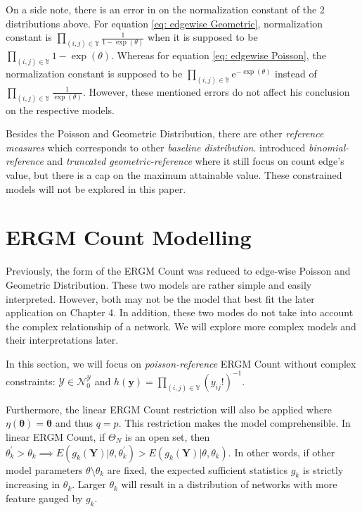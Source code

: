 \documentclass[12pt,a4paper,twoside,openany]{book}\usepackage[]{graphicx}\usepackage[]{color}
\newcommand{\me}{\mathrm{e}}
\begin{document}
On a side note, there is an error in \citet{countergmdefined} on the normalization constant of the 2 distributions above. 
For equation \ref{eq: edgewise Geometric}, \citet{countergmdefined} normalization constant is $\prod_{(i,j) \in \mathbb{Y}}\frac{1}{1-\exp(\theta)}$ when it is supposed to be  $\prod_{(i,j) \in \mathbb{Y}}1-\exp(\theta)$.
Whereas for equation \ref{eq: edgewise Poisson}, the normalization constant is supposed to be $\prod_{(i,j) \in \mathbb{Y}} \me^{-\exp(\theta)}$ instead of $\prod_{(i,j) \in \mathbb{Y}}\frac{1}{\exp(\theta)}$. 
However, these mentioned errors do not affect his conclusion on the respective models.

Besides the Poisson and Geometric Distribution, there are other \textit{reference measures} which corresponds to other \textit{baseline distribution}.
\citet{countergmapplied} introduced \textit{binomial-reference} and \textit{truncated geometric-reference} where it still focus on count edge's value, but there is a cap on the maximum attainable value.  
These constrained models will not  be explored in this paper.

\section{ERGM Count Modelling}
Previously, the form of the ERGM Count was reduced to edge-wise Poisson and Geometric Distribution. 
These two models are rather simple and easily interpreted. 
However, both may not be the model that best fit the later application on Chapter 4.
In addition, these two modes do not take into account the complex relationship of a network.
We will explore more complex models and their interpretations later.

In this section, we will focus on \textit{poisson-reference} ERGM Count without complex constraints: $\mathcal{Y} \in \mathcal{N}_0^{\mathcal{Y}}$ and $h(\bm{y}) = \prod_{(i,j) \in \mathbb{Y}}(y_{ij}!)^{-1}$. 

Furthermore, the linear ERGM Count restriction will also be applied where $\eta(\bm{\theta}) = \bm{\theta}$ and thus $q = p$. 
This restriction makes the model comprehensible. 
In linear ERGM Count, if $\Theta_{N}$ is an open set, then $\theta_{k}^{\prime} >\theta_{k} \implies E(g_k(\bm{Y})|\theta,\theta_k^{\prime})>E(g_k(\bm{Y})|\theta,\theta_k)$. 
In other words, if other model parameters $\theta \setminus \theta_k$ are fixed, the expected sufficient statistics $g_k$ is strictly increasing in $\theta_k$.
Larger $\theta_k$ will result in a distribution of networks with more feature gauged by $g_k$.
\end{document}
